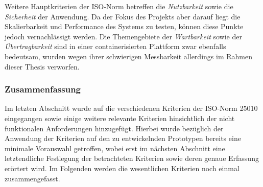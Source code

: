 Weitere Hauptkriterien der ISO-Norm betreffen die \emph{Nutzbarkeit} sowie die \emph{Sicherheit} der Anwendung. Da der Fokus des Projekts aber darauf liegt die Skalierbarkeit und Performance des Systems zu testen, können diese Punkte jedoch vernachlässigt werden. Die Themengebiete der \emph{Wartbarkeit} sowie der \emph{Übertragbarkeit} sind in einer containerisierten Plattform zwar ebenfalls bedeutsam, wurden wegen ihrer schwierigen Messbarkeit allerdings im Rahmen dieser Thesis verworfen. 


\subsubsection{Zusammenfassung}
Im letzten Abschnitt wurde auf die verschiedenen Kriterien der ISO-Norm 25010 eingegangen sowie einige weitere relevante Kriterien hinsichtlich der nicht funktionalen Anforderungen hinzugefügt. Hierbei wurde bezüglich der Anwendung der Kriterien auf den zu entwickelnden Prototypen bereits eine minimale Vorauswahl getroffen, wobei erst im nächsten Abschnitt eine letztendliche Festlegung der betrachteten Kriterien sowie deren genaue Erfassung erörtert wird. Im Folgenden werden die wesentlichen Kriterien noch einmal zusammengefasst.

